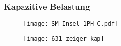 \begin{flushleft}




\subsubsection{Kapazitive Belastung}

\begin{figure}[H]
\begin{minipage}[t]{0.65\textwidth}
\centering
\texttt{[image: SM\_Insel\_1PH\_C.pdf]}
\label{fig:SM_Insel_1PH_C}
\end{minipage}
\begin{minipage}[t]{0.3\textwidth}
\centering
\texttt{[image: 631\_zeiger\_kap]}
    \label{fig:ZeigerC}
\end{minipage}
\end{figure}



\end{flushleft}
